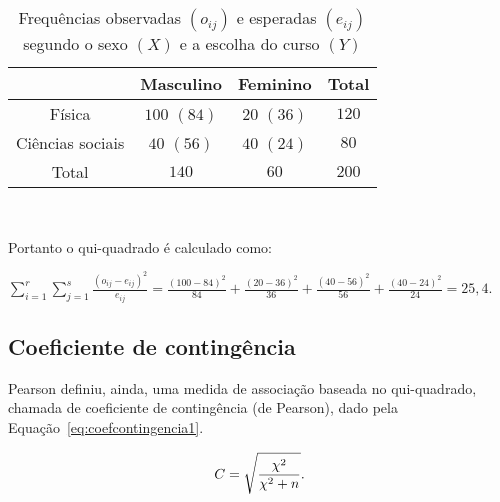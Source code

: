 \documentclass[11pt,fleqn]{book} %
\begin{document}
\begin{example}
\begin{table}[h]
\caption{Frequências observadas $(o_{ij})$ e esperadas $(e_{ij})$ segundo o sexo $(X)$ e a escolha do curso $(Y)$}
	\label{tab:quiquadrado} 
	\vspace{-0.1cm}
	\centering
	\begin{tabular}{c | c c | c}
	\toprule
	\backslashbox{$\bm Y$}{$\bm X$} & \textbf{Masculino} & \textbf{Feminino} & \textbf{Total} \\
	\midrule
	Física & $100$ \textcolor{ocre}{$(84)$} & $20$ \textcolor{ocre}{$(36)$} & $120$ \\
	Ciências sociais & $40$ \textcolor{ocre}{$(56)$} & $40$ \textcolor{ocre}{$(24)$} & $80$ \\
	\midrule
	Total & $140$ & $60$ & $200$ \\
	\bottomrule
	\end{tabular} \\
\end{table}

Portanto o qui-quadrado é calculado como: \\

\begin{center}
$\displaystyle \sum_{i=1}^r \sum_{j=1}^s \frac{(o_{ij}-e_{ij})^2}{e_{ij}}
= \frac{(100-84)^2}{84} + \frac{(20-36)^2}{36}
+ \frac{(40-56)^2}{56} + \frac{(40-24)^2}{24} 
= 25,4$. \\
\end{center}


\end{example}



\subsection{Coeficiente de contingência}

Pearson definiu, ainda, uma medida de associação baseada no qui-quadrado, chamada de coeficiente de contingência (de Pearson), dado pela Equação~\ref{eq:coefcontingencia1}. \\

\begin{eBox}
\vspace{-0.5cm}
\begin{equation} \label{eq:coefcontingencia1}
\displaystyle C=\sqrt{\frac{\chi^2}{\chi^2+n}}. \\
\end{equation}
\end{eBox}

\vspace{0,2cm}
\end{document}
